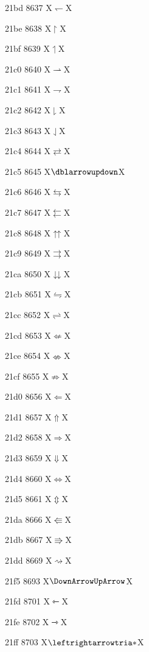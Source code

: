 \documentclass[11pt]{article}
\begin{document}
21bd 8637 X{\ensuremath{\leftharpoondown}}X

21be 8638 X{\ensuremath{\upharpoonright}}X

21bf 8639 X{\ensuremath{\upharpoonleft}}X

21c0 8640 X{\ensuremath{\rightharpoonup}}X

21c1 8641 X{\ensuremath{\rightharpoondown}}X

21c2 8642 X{\ensuremath{\downharpoonright}}X

21c3 8643 X{\ensuremath{\downharpoonleft}}X

21c4 8644 X{\ensuremath{\rightleftarrows}}X

21c5 8645 X{\ensuremath{\dblarrowupdown}}X

21c6 8646 X{\ensuremath{\leftrightarrows}}X

21c7 8647 X{\ensuremath{\leftleftarrows}}X

21c8 8648 X{\ensuremath{\upuparrows}}X

21c9 8649 X{\ensuremath{\rightrightarrows}}X

21ca 8650 X{\ensuremath{\downdownarrows}}X

21cb 8651 X{\ensuremath{\leftrightharpoons}}X

21cc 8652 X{\ensuremath{\rightleftharpoons}}X

21cd 8653 X{\ensuremath{\nLeftarrow}}X

21ce 8654 X{\ensuremath{\nLeftrightarrow}}X

21cf 8655 X{\ensuremath{\nRightarrow}}X

21d0 8656 X{\ensuremath{\Leftarrow}}X

21d1 8657 X{\ensuremath{\Uparrow}}X

21d2 8658 X{\ensuremath{\Rightarrow}}X

21d3 8659 X{\ensuremath{\Downarrow}}X

21d4 8660 X{\ensuremath{\Leftrightarrow}}X

21d5 8661 X{\ensuremath{\Updownarrow}}X

21da 8666 X{\ensuremath{\Lleftarrow}}X

21db 8667 X{\ensuremath{\Rrightarrow}}X

21dd 8669 X{\ensuremath{\rightsquigarrow}}X

21f5 8693 X{\ensuremath{\DownArrowUpArrow}}X

21fd 8701 X{\ensuremath{\leftarrowtriangle}}X

21fe 8702 X{\ensuremath{\rightarrowtriangle}}X

21ff 8703 X{\ensuremath{\leftrightarrowtria*}}X
\end{document}
